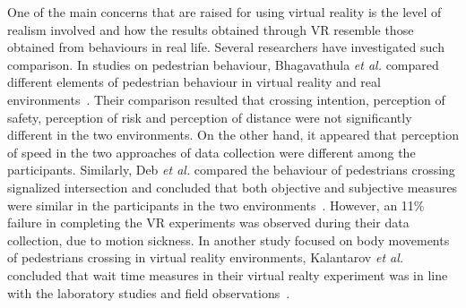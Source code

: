One of the main concerns that are raised for using virtual reality is the level of realism involved and how the results obtained through VR resemble those obtained from behaviours in real life. Several researchers have investigated such comparison. In studies on pedestrian behaviour, Bhagavathula \textit{et al.} compared different elements of pedestrian behaviour in virtual reality and real environments~\cite{bhagavathula2018reality}. Their comparison resulted that crossing intention, perception of safety, perception of risk and perception of distance were not significantly different in the two environments. On the other hand, it appeared that perception of speed in the two approaches of data collection were different among the participants. Similarly, Deb \textit{et al.} compared the behaviour of pedestrians crossing signalized intersection and concluded that both objective and subjective measures were similar in the participants in the two environments~\cite{deb2017efficacy}. However, an 11\% failure in completing the VR experiments was observed during their data collection, due to motion sickness. In another study focused on body movements of pedestrians crossing in virtual reality environments, Kalantarov \textit{et al.} concluded that wait time measures in their virtual realty experiment was in line with the laboratory studies and field observations~\cite{kalantarov2018pedestrians}.




 


